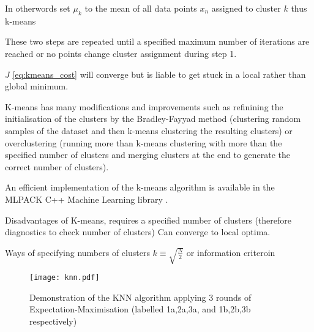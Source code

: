 In otherwords set \(\mu_{k}\) to the mean of all data points \(x_{n}\) assigned to cluster \(k\) thus k-means \citep{Bishop2006}

These two steps are repeated until a specified maximum number of iterations are reached or no points change cluster assignment during
step 1.

\(J\) \ref{eq:kmeans_cost} will converge but is liable to get stuck in a local rather than global minimum.

K-means has many modifications and improvements such as refinining the initialisation of the clusters by 
the Bradley-Fayyad method (clustering random samples of the dataset and then k-means clustering the resulting clusters) \citep{Bradley1998} 
or overclustering (running more than k-means clustering with more than the specified number of clusters and merging clusters at the end
to generate the correct number of clusters).

An efficient implementation of the k-means algorithm is available in the MLPACK C++ Machine Learning library \citep{mlpack2013}.






Disadvantages of K-means, requires a specified number of clusters (therefore diagnostics to check number of clusters)
Can converge to local optima.

Ways of specifying numbers of clusters \(k \equiv \sqrt{\frac{N}{2}}\) or information criteroin



\begin{figure}[h]
    \texttt{[image: knn.pdf]}
    \caption{Demonstration of the KNN algorithm applying 3 rounds of Expectation-Maximisation (labelled
    1a,2a,3a, and 1b,2b,3b respectively) }
    \label{fig:knn}
\end{figure}




%
%
% 
%
%
%







